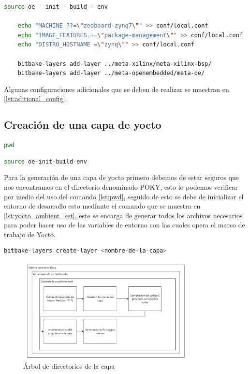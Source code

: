 \begin{lstlisting}[language=bash, caption={Configuraciones adicionales, Yocto}, label=lst:aditional_config]
    source oe - init - build - env
    
    echo "MACHINE ??=\"zedboard-zynq7\"" >> conf/local.conf
    echo "IMAGE_FEATURES +=\"package-management\"" >> conf/local.conf
    echo "DISTRO_HOSTNAME =\"zynq\"" >> conf/local.conf
    
    bitbake-layers add-layer ../meta-xilinx/meta-xilinx-bsp/
    bitbake-layers add-layer ../meta-openembedded/meta-oe/
\end{lstlisting}

Algunas configuraciones adicionales que se deben de realizar se muestran en \ref{lst:aditional_config}.

\subsection{Creación de una capa de yocto}

\begin{lstlisting}[language=bash, caption={"Print Working Directory",Linux}, label=lst:pwd]
    pwd
\end{lstlisting}

\begin{lstlisting}[language=bash, caption={Inicializar ambiente, Yocto}, label=lst:yocto_ambient_set]
    source oe-init-build-env
\end{lstlisting}

Para la generación de una capa de yocto primero debemos de estar seguros que nos encontramos en el directorio denominado POKY, esto lo podemos verificar por medio del uso del comando \ref{lst:pwd}, seguido de esto se debe de inicializar el entorno de desarrollo esto mediante el comando que se muestra en \ref{lst:yocto_ambient_set}, este se encarga de generar todos los archivos necesarios para poder hacer uso de las variables de entorno con las cuales opera el marco de trabajo de Yocto.

\begin{lstlisting}[language=bash, caption={Generar nueva capa, Yocto }, label=lst:yocto_new_layer]
    bitbake-layers create-layer <nombre-de-la-capa>
\end{lstlisting}

\begin{figure}[h!]
    \centering
    \includegraphics[width=0.8\textwidth]{fig/especifico_2/Flujo de trabajo de mi idea.pdf}
    \caption{Árbol de directorios de la capa}
    \label{fig:arbol_capa_custom_yocto}
\end{figure}


